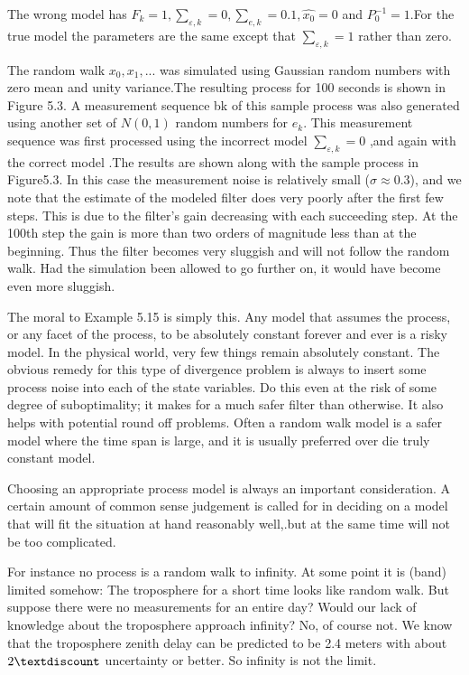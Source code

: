 The wrong model has $ F_{k}=1,\sum\nolimits_{\varepsilon,k}=0,\sum\nolimits_{e,k}=0.1, \hat{x_{0}}=0 $ and $ P_{0}^{-1}=1 $.For the true model the parameters are the same except that $ \sum\nolimits_{\varepsilon,k}=1 $ rather than zero. 

 
 The random walk $x_{0},x_{1},...  $ was simulated using Gaussian random numbers with zero mean and unity variance.The resulting process for 100 seconds is shown in Figure 5.3. A measurement sequence bk of this sample process was also generated using another set of $ N(0, 1) $ random numbers for $ e_{k} $. This measurement sequence was first processed using the incorrect model $ \sum\nolimits_{\varepsilon,k}=0  $ ,and again with the correct model .The results are shown along with the sample process in Figure5.3. In this case the measurement noise is relatively small ($ \sigma\approx0.3 $), and we note that the estimate of the modeled filter does very poorly after the first few steps. This is due to the filter’s gain decreasing with each succeeding step. At the 100th step the gain is more than two orders of magnitude less than at the beginning. Thus the filter becomes very sluggish and will not follow the random walk. Had the simulation been allowed to go further on, it would have become even more sluggish.
 
 The moral to Example 5.15 is simply this. Any model that assumes the process, or any facet of the process, to be absolutely constant forever and ever is a risky model. In the physical world, very few things remain absolutely constant. The obvious remedy for this type of divergence problem is always to insert some process noise into each of the state variables. Do this even at the risk of some degree of suboptimality; it makes for a much safer filter than otherwise. It also helps with potential round off problems. Often a random walk model is a safer model where the time span is large, and it is usually preferred over die truly constant model. 
 
 Choosing an appropriate process model is always an important consideration. A certain amount of common sense judgement is called for in deciding on a model that will fit the situation at hand reasonably well,.but at the same time will not be too complicated. 
 
 For instance no process is a random walk to infinity. At some point it is (band) limited somehow: The troposphere for a short time looks like random walk. But suppose there were no measurements for an entire day? Would our lack of knowledge about the troposphere approach infinity? No, of course not. We know that the troposphere zenith delay can be predicted to be 2.4 meters with about $ 2\textdiscount $ uncertainty or better. So infinity is not the limit. 
 
